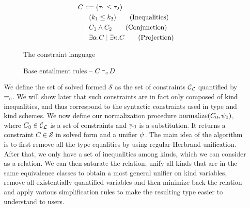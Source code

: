 \begin{figure*}[!bt]
  \centering
  \begin{minipage}{0.32\linewidth}
    \begin{align*}
      C &::= (\tau_1 \leq \tau_2) \\
        &\mid (k_1 \leq k_2) \tag{Inequalities} \\
        &\mid C_1 \wedge C_2  \tag{Conjunction}\\
        &\mid \exists \alpha.C
        \mid \exists \kappa.C \tag{Projection}
    \end{align*}
    \caption{The constraint language}
    \label{grammar:constraint}
  \end{minipage}\hfill
  \begin{minipage}{0.66\linewidth}
    \caption{Base entailment rules -- $C \operatorname{\vdash_e} D$ }
    \label{rules:entail}
  \end{minipage}
\end{figure*}

We define the set of solved formed
$\mathcal S$ as the set of constraints ${\mathcal C_{\mathcal L}}$ quantified by $\operatorname{=_e}$.
We will show later that such constraints are in fact only composed of
kind inequalities, and thus correspond to the syntactic constraints
used in type and kind schemes.
%
We now define our normalization procedure $\operatorname{normalize}(C_0,\mathrm{\psi}_0)$, where
$C_0\in {\mathcal C_{\mathcal L}}$ is a set of constraints and $\mathrm{\psi}_0$ is a substitution.
It returns a constraint $C \in \mathcal S$ in
solved form and a unifier $\mathrm{\psi}$.
The main idea of the algorithm is to first remove all the type equalities
by using regular Herbrand unification. After that, we only have
a set of inequalities among kinds, which we can consider as a relation.
We can then saturate the relation,
unify all kinds that are in the same equivalence classes to obtain
a most general unifier on kind variables,
remove all existentially quantified variables and
then minimize back the relation and apply various
simplification rules to make the resulting type easier to understand to users.


